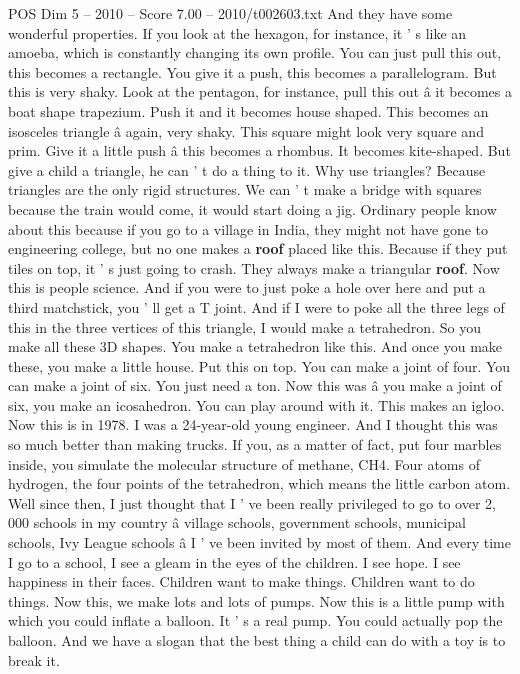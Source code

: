 \begin{textsample}{POS Dim 5 – 2010 – Score 7.00 – 2010/t002603.txt}
And they have some wonderful properties.
If you look at the hexagon, for instance, it ' s like an amoeba, which is constantly changing its own profile.
You can just pull this out, this becomes a rectangle.
You give it a push, this becomes a parallelogram.
But this is very shaky.
Look at the pentagon, for instance, pull this out â it becomes a boat shape trapezium.
Push it and it becomes house shaped.
This becomes an isosceles triangle â again, very shaky.
This square might look very square and prim.
Give it a little push â this becomes a rhombus.
It becomes kite-shaped.
But give a child a triangle, he can ' t do a thing to it.
Why use triangles?
Because triangles are the only rigid structures.
We can ' t make a bridge with squares because the train would come, it would start doing a jig.
Ordinary people know about this because if you go to a village in India, they might not have gone to engineering college, but no one makes a \textbf{roof} placed like this.
Because if they put tiles on top, it ' s just going to crash.
They always make a triangular \textbf{roof}.
Now this is people science.
And if you were to just poke a hole over here and put a third matchstick, you ' ll get a T joint.
And if I were to poke all the three legs of this in the three vertices of this triangle, I would make a tetrahedron.
So you make all these 3D shapes.
You make a tetrahedron like this.
And once you make these, you make a little house.
Put this on top.
You can make a joint of four.
You can make a joint of six.
You just need a ton.
Now this was â you make a joint of six, you make an icosahedron.
You can play around with it.
This makes an igloo.
Now this is in 1978.
I was a 24-year-old young engineer.
And I thought this was so much better than making trucks.
If you, as a matter of fact, put four marbles inside, you simulate the molecular structure of methane, CH4.
Four atoms of hydrogen, the four points of the tetrahedron, which means the little carbon atom.
Well since then, I just thought that I ' ve been really privileged to go to over 2, 000 schools in my country â village schools, government schools, municipal schools, Ivy League schools â I ' ve been invited by most of them.
And every time I go to a school, I see a gleam in the eyes of the children.
I see hope.
I see happiness in their faces.
Children want to make things.
Children want to do things.
Now this, we make lots and lots of pumps.
Now this is a little pump with which you could inflate a balloon.
It ' s a real pump.
You could actually pop the balloon.
And we have a slogan that the best thing a child can do with a toy is to break it.

\end{textsample}
